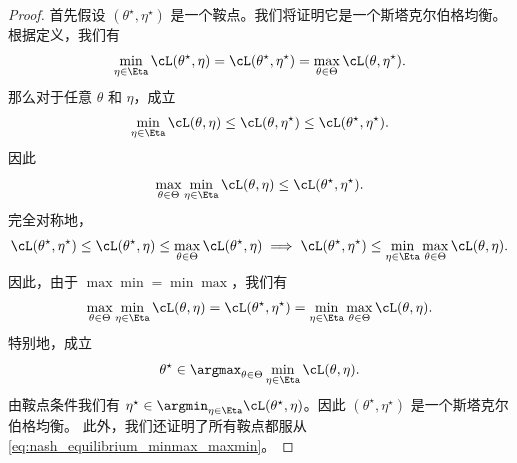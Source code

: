\documentclass[../../book-main_zh.tex]{subfiles}
\begin{document}
\begin{proof}
    首先假设 \((\theta^{\star}, \eta^{\star})\) 是一个鞍点。我们将证明它是一个斯塔克尔伯格均衡。根据定义，我们有
    \begin{equation}
        \min_{\eta \in \Eta}\cL(\theta^{\star}, \eta) =
        \cL(\theta^{\star}, \eta^{\star}) = \max_{\theta \in
        \Theta}\cL(\theta, \eta^{\star}).
    \end{equation}
    那么对于任意 \(\theta\) 和 \(\eta\)，成立
    \begin{equation}
        \min_{\eta \in \Eta}\cL(\theta, \eta) \leq \cL(\theta,
        \eta^{\star}) \leq \cL(\theta^{\star}, \eta^{\star}).
    \end{equation}
    因此
    \begin{equation}
        \max_{\theta \in \Theta}\min_{\eta \in \Eta}\cL(\theta, \eta) \leq
        \cL(\theta^{\star}, \eta^{\star}).
    \end{equation}
    完全对称地，
    \begin{equation}
        \cL(\theta^{\star}, \eta^{\star}) \leq \cL(\theta^{\star},
        \eta) \leq \max_{\theta \in \Theta}\cL(\theta^{\star}, \eta)
        \implies \cL(\theta^{\star}, \eta^{\star}) \leq \min_{\eta
        \in \Eta}\max_{\theta \in \Theta}\cL(\theta, \eta).
    \end{equation}
    因此，由于 \(\max\min = \min\max\)，我们有
    \begin{equation}\label{eq:nash_equilibrium_minmax_maxmin}
        \max_{\theta \in \Theta}\min_{\eta \in \Eta}\cL(\theta, \eta)
        = \cL(\theta^{\star}, \eta^{\star}) = \min_{\eta \in
        \Eta}\max_{\theta \in \Theta}\cL(\theta, \eta).
    \end{equation}
    特别地，成立
    \begin{equation}
        \theta^{\star} \in \argmax_{\theta \in \Theta}\min_{\eta \in
        \Eta}\cL(\theta, \eta).
    \end{equation}
    由鞍点条件我们有 \(\eta^{\star} \in
    \argmin_{\eta \in \Eta}\cL(\theta^{\star}, \eta)\)。因此
    \((\theta^{\star}, \eta^{\star})\) 是一个斯塔克尔伯格均衡。
    此外，我们还证明了所有鞍点都服从
    \eqref{eq:nash_equilibrium_minmax_maxmin}。


\end{proof}
\end{document}

